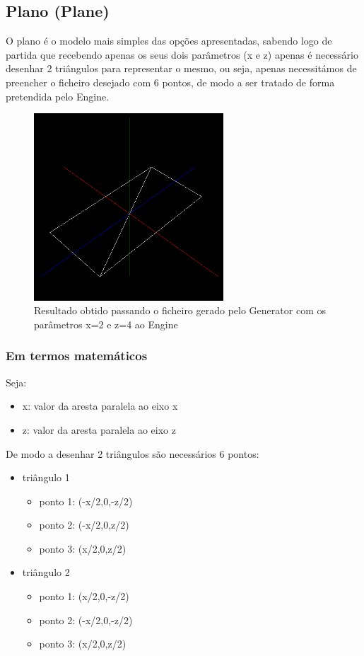 \documentclass{article}
\begin{document}
\subsection{Plano (Plane)}
O plano é o modelo mais simples das opções apresentadas, sabendo logo de partida que recebendo apenas os seus dois parâmetros (x e z) apenas é necessário desenhar 2 triângulos para representar o mesmo, ou seja, apenas necessitámos de preencher o ficheiro desejado com 6 pontos, de modo a ser tratado de forma pretendida pelo Engine.

\begin{figure}[H]
\centering
\includegraphics[height=7cm]{plane.png}
\caption{Resultado obtido passando o ficheiro gerado pelo Generator com os parâmetros x=2 e z=4 ao Engine}
\end{figure}

\subsubsection{Em termos matemáticos}
Seja:
\begin{itemize}
    \item x: valor da aresta paralela ao eixo x
    \item z: valor da aresta paralela ao eixo z
\end{itemize}
De modo a desenhar 2 triângulos são necessários 6 pontos:
\begin{itemize}
    \item triângulo 1
        \begin{itemize}
            \item ponto 1: (-x/2,0,-z/2)
            \item ponto 2: (-x/2,0,z/2)
            \item ponto 3: (x/2,0,z/2)
        \end{itemize}
    \item triângulo 2
        \begin{itemize}
            \item ponto 1: (x/2,0,-z/2)
            \item ponto 2: (-x/2,0,-z/2)
            \item ponto 3: (x/2,0,z/2)
        \end{itemize}
\end{itemize}
\end{document}
